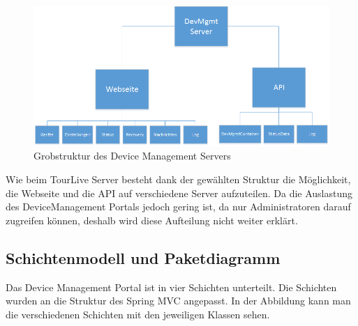 \begin{figure}[H]
	\centering
	\includegraphics[width=120mm]{images/devmgmtsrv/uebersicht.png}
	\caption{Grobstruktur des Device Management Servers}
\end{figure}

Wie beim TourLive Server besteht dank der gewählten Struktur die Möglichkeit, die Webseite und die API auf verschiedene Server aufzuteilen. Da die Auslastung des DeviceManagement Portals jedoch gering ist, da nur Administratoren darauf zugreifen können, deshalb wird diese Aufteilung nicht weiter erklärt.

\subsection{Schichtenmodell und Paketdiagramm}
Das Device Management Portal ist in vier Schichten unterteilt. Die Schichten wurden an die Struktur des Spring MVC angepasst. In der Abbildung kann man die verschiedenen Schichten mit den jeweiligen Klassen sehen.

